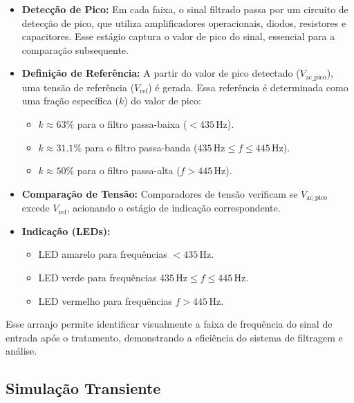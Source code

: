 \documentclass[a4paper, 12pt]{article}
\begin{document}
\begin{itemize}
    \item \textbf{Detecção de Pico:} Em cada faixa, o sinal filtrado passa por um circuito de detecção de pico, que utiliza amplificadores operacionais, diodos, resistores e capacitores. Esse estágio captura o valor de pico do sinal, essencial para a comparação subsequente.
    
    \item \textbf{Definição de Referência:} A partir do valor de pico detectado (\(V_{\mathrm{ac\_pico}}\)), uma tensão de referência (\(V_{\mathrm{ref}}\)) é gerada. Essa referência é determinada como uma fração específica (\(k\)) do valor de pico:
    \begin{itemize}
        \item \(k \approx 63\%\) para o filtro passa-baixa (\(< 435 \, \mathrm{Hz}\)).
        \item \(k \approx 31.1\%\) para o filtro passa-banda (\(435 \, \mathrm{Hz} \leq f \leq 445 \, \mathrm{Hz}\)).
        \item \(k \approx 50\%\) para o filtro passa-alta (\(f > 445 \, \mathrm{Hz}\)).
    \end{itemize}

    \item \textbf{Comparação de Tensão:} Comparadores de tensão verificam se \(V_{\mathrm{ac\_pico}}\) excede \(V_{\mathrm{ref}}\), acionando o estágio de indicação correspondente.

    \item \textbf{Indicação (LEDs):} 
    \begin{itemize}
        \item LED amarelo para frequências \(< 435 \, \mathrm{Hz}\).
        \item LED verde para frequências \(435 \, \mathrm{Hz} \leq f \leq 445 \, \mathrm{Hz}\).
        \item LED vermelho para frequências \(f > 445 \, \mathrm{Hz}\).
    \end{itemize}
\end{itemize}

Esse arranjo permite identificar visualmente a faixa de frequência do sinal de entrada após o tratamento, demonstrando a eficiência do sistema de filtragem e análise.



\subsection{Simulação Transiente}
\end{document}
